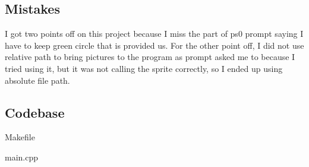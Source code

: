 
\subsection{Mistakes}\label{sec:ps0:mistakes}
I got two points off on this project because I miss the part of ps0 prompt saying I have to keep green circle that is provided us. For the other point off, I did not use relative path to bring pictures to the program as prompt asked me to because I tried using it, but it was not calling the sprite correctly, so I ended up using absolute file path.


\subsection{Codebase}\label{sec:ps0:code}
Makefile

main.cpp


\newpage
